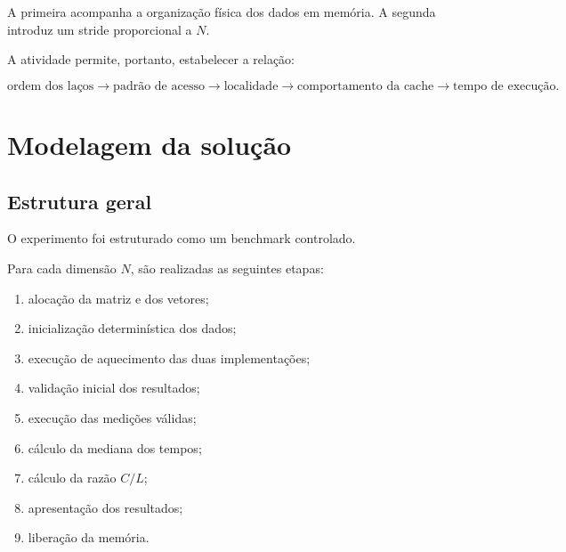 A primeira acompanha a organização física dos dados em memória. A segunda
introduz um stride proporcional a \(N\).

A atividade permite, portanto, estabelecer a relação:

\begin{equation}
\text{ordem dos laços}
\rightarrow
\text{padrão de acesso}
\rightarrow
\text{localidade}
\rightarrow
\text{comportamento da cache}
\rightarrow
\text{tempo de execução}.
\end{equation}



\section{Modelagem da solução}

\label{sec:atvd01-modelagem}

\subsection{Estrutura geral}

O experimento foi estruturado como um benchmark controlado.

Para cada dimensão \(N\), são realizadas as seguintes etapas:

\begin{enumerate}

    \item alocação da matriz e dos vetores;

    \item inicialização determinística dos dados;

    \item execução de aquecimento das duas implementações;

    \item validação inicial dos resultados;

    \item execução das medições válidas;

    \item cálculo da mediana dos tempos;

    \item cálculo da razão \(C/L\);

    \item apresentação dos resultados;

    \item liberação da memória.

\end{enumerate}

